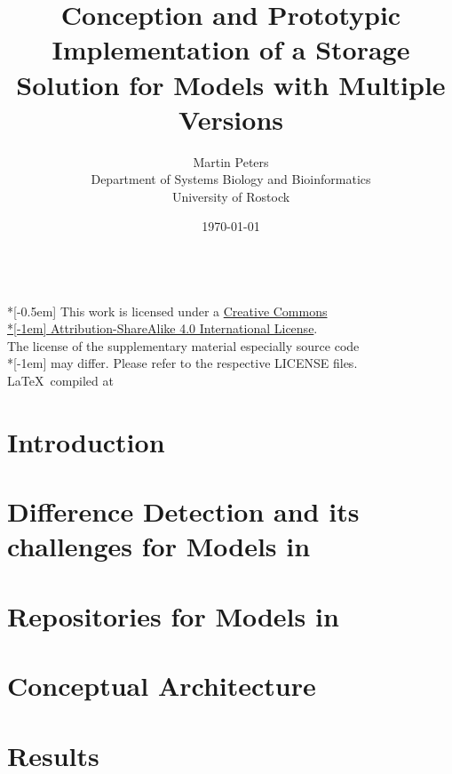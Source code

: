 \documentclass[12pt, a4paper, titlepage]{book}
\title{Conception and Prototypic Implementation of a Storage Solution for Models with Multiple Versions}
\author{Martin Peters\\[12pt]
	\small Department of Systems Biology and Bioinformatics\\
	\small University of Rostock}
\date{\today}
\begin{document}
	\maketitle
	\pagebreak
	~ \vfill
	{
		\tiny \noindent
		{\normalsize \href{http://creativecommons.org/licenses/by-sa/4.0/}{\ccbysa}} \\*[-0.5em]
		This work is licensed under a \href{http://creativecommons.org/licenses/by-sa/4.0/}{Creative Commons\\*[-1em] Attribution-ShareAlike 4.0 International License}. \\
		The license of the supplementary material especially source code\\*[-1em]
		may differ. Please refer to the respective LICENSE files.\\
		\LaTeX ~compiled at \DTMnow
	}
	\pagebreak
	\tableofcontents
	\listoffigures
	
	
	\chapter{Introduction}
	
	
	\chapter{Difference Detection and its challenges for Models in \sysbio}
	
	
	\chapter{Repositories for Models in \sysbio}
	
	
	\chapter{Conceptual Architecture}
	
	
	\chapter{Results}
	
	
\end{document}
